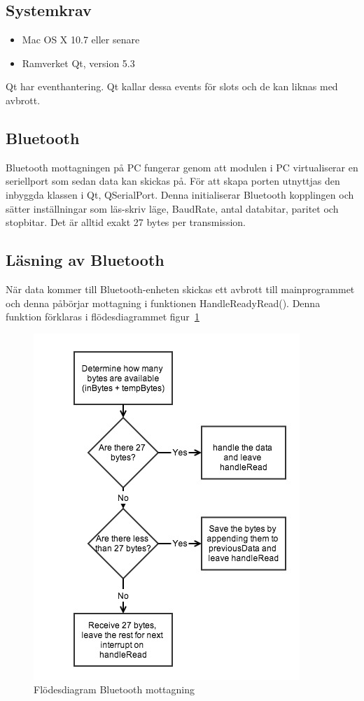 \documentclass[a4paper,12pt,fleqn]{article}
\begin{document}
\subsection{Systemkrav}
\begin{itemize}
	\item Mac OS X 10.7 eller senare
	\item Ramverket Qt, version 5.3
\end{itemize}

Qt har eventhantering. Qt kallar dessa events för slots och de kan liknas med avbrott.

\subsection{Bluetooth}
Bluetooth mottagningen på PC fungerar genom att modulen i PC virtualiserar en seriellport som sedan data kan skickas på. För att skapa porten utnyttjas den inbyggda klassen i Qt, QSerialPort. Denna initialiserar Bluetooth kopplingen och sätter inställningar som läs-skriv läge, BaudRate, antal databitar, paritet och stopbitar.
Det är alltid exakt 27 bytes per transmission.

\subsection{Läsning av Bluetooth}
När data kommer till Bluetooth-enheten skickas ett avbrott till mainprogrammet och denna påbörjar mottagning i funktionen HandleReadyRead(). Denna funktion förklaras i flödesdiagrammet figur~\ref{fig:BTpc}

\begin{figure}[htp] %
  \begin{center}
  \includegraphics[keepaspectratio=true,width=0.6\linewidth]{bilder/bluetoothpc.jpg}  %
  \end{center}
  \caption{Flödesdiagram Bluetooth mottagning} %
  \label{fig:BTpc}
\end{figure}
\end{document}
